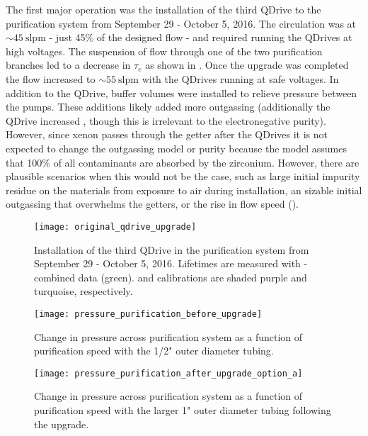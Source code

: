 The first major operation was the installation of the third QDrive to the purification system from September 29 - October 5, 2016.  The
circulation was at ${\sim} 45\ \mathrm{slpm}$ - just 45\% of the designed flow - and required running the QDrives at high voltages.  The
suspension of flow through one of the two purification branches led to a decrease in $\tau_e$ as shown in
.  Once the upgrade was completed the flow increased to
${\sim}55\ \mathrm{slpm}$ with
the QDrives running at safe voltages.  In addition to the QDrive, buffer volumes were installed to relieve pressure between
the pumps.  These additions likely added more outgassing
(additionally the QDrive increased , though this is irrelevant to the electronegative purity).  However, since xenon passes
through the
getter after the QDrives it is not expected to change the outgassing model or purity because the model assumes that 100\% of all
contaminants are
absorbed by the zirconium.  However, there are plausible scenarios when this would not be the case, such as large initial impurity residue
on the materials from exposure to air during installation, an sizable initial outgassing that overwhelms the getters, or the rise
in flow speed ().

\begin{figure}
\centering
\texttt{[image: original\_qdrive\_upgrade]}
\caption{Installation of the third QDrive in the purification system from September 29 - October 5, 2016.  Lifetimes are measured
with - combined data (green).   and \ambe calibrations are shaded purple and turquoise,
respectively.}
\label{fig:electron_lifetime_model_ops_original_qdrive_upgrade}
\end{figure}

\begin{figure}
\centering
\texttt{[image: pressure\_purification\_before\_upgrade]}
\caption{Change in pressure across purification system as a function of purification speed with the 1/2" outer diameter tubing.}
\label{fig:electron_lifetime_model_ops_original_pressure}
\end{figure}

\begin{figure}
\centering
\texttt{[image: pressure\_purification\_after\_upgrade\_option\_a]}
\caption{Change in pressure across purification system as a function of purification speed with the larger 1" outer diameter tubing following
the upgrade.}
\label{fig:electron_lifetime_model_ops_improved_pressure}
\end{figure}


